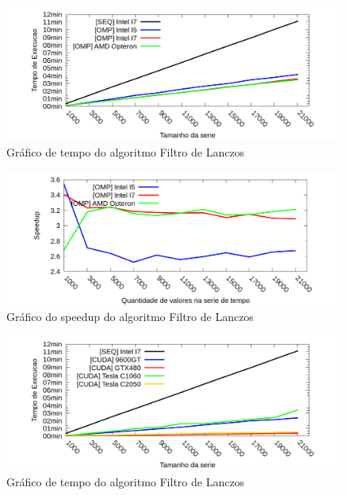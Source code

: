 \begin{figure}[H]
\centering
\includegraphics[width=1.0\textwidth]{Imagens/graficos_lanczos/lanczos_tempos_omp.png}
\caption{Gráfico de tempo do algoritmo Filtro de Lanczos}
\label{fig:grafico_tempo_lanczos_omp}
\end{figure}

\begin{figure}[H]
\centering
\includegraphics[width=1.0\textwidth]{Imagens/graficos_lanczos/lanczos_speedup_omp.png}
\caption{Gráfico do speedup do algoritmo Filtro de Lanczos}
\label{fig:grafico_speedup_lanczos_omp}
\end{figure}

\begin{figure}[H]
\centering
\includegraphics[width=1.0\textwidth]{Imagens/graficos_lanczos/lanczos_tempos_cuda.png}
\caption{Gráfico de tempo do algoritmo Filtro de Lanczos}
\label{fig:grafico_tempo_lanczos_cuda}
\end{figure}

